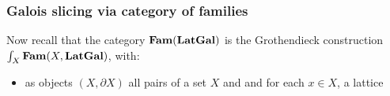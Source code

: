 \subsubsection{Galois slicing via category of families}

Now recall that the category $\mathbf{Fam}(\mathbf{LatGal})$ is the Grothendieck construction $\int_{X}\mathbf{Fam}(X,
\mathbf{LatGal})$, with:
\begin{itemize}
\item as objects $(X, \partial X)$ all pairs of a set $X$ and and for each $x \in X$, a lattice
\end{itemize}
